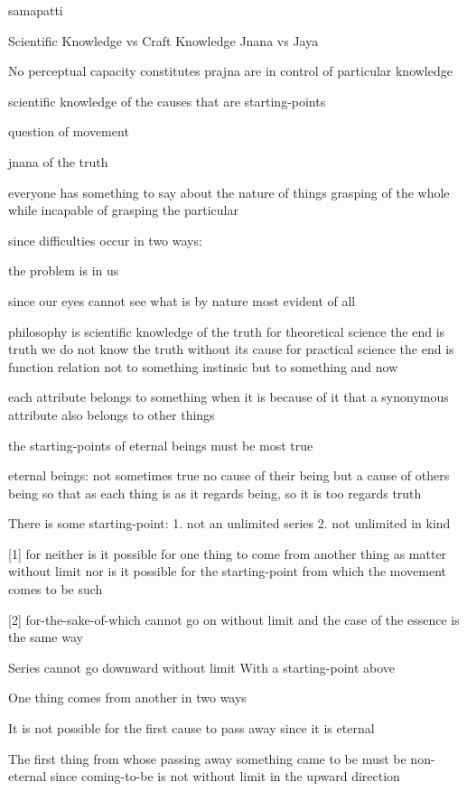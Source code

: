 samapatti

Scientific Knowledge vs Craft Knowledge
Jnana vs Jaya

No perceptual capacity constitutes prajna
    are in control of particular knowledge

scientific knowledge of the causes that are starting-points

question of movement

jnana of the truth

everyone has something to say about the nature of things
grasping of the whole while incapable of grasping the particular

since difficulties occur in two ways:

the problem is in us

since our eyes cannot see what is by nature most evident of all

philosophy is scientific knowledge of the truth
for theoretical science the end is truth
we do not know the truth without its cause
for practical science the end is function
relation not to something instinsic but to something and now

each attribute belongs to something when it is because of it
that a synonymous attribute also belongs to other things


the starting-points of eternal beings must be most true

eternal beings: 
not sometimes true
no cause of their being
but a cause of others being
so that as each thing is as it regards being,
so it is too regards truth

There is some starting-point:
1. not an unlimited series
2. not unlimited in kind

[1] for neither is it possible for one thing to come from another thing
as matter without limit nor is it possible for the starting-point
from which the movement comes to be such

[2] for-the-sake-of-which cannot go on without limit
and the case of the essence is the same way

Series cannot go downward without limit
With a starting-point above

One thing comes from another in two ways

It is not possible for the first cause to pass away
since it is eternal

The first thing from whose passing away something came to be must be non-eternal
since coming-to-be is not without limit in the upward direction

